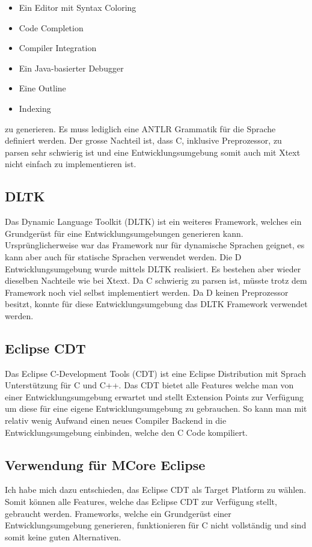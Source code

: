 \begin{itemize} 
	\item Ein Editor mit Syntax Coloring
	\item Code Completion
	\item Compiler Integration
	\item Ein Java-basierter Debugger
	\item Eine Outline
	\item Indexing
\end{itemize}

zu generieren. \cite{xtext} Es muss lediglich eine ANTLR\cite{antlr} Grammatik für die Sprache definiert werden. Der grosse Nachteil ist, dass C, inklusive Preprozessor, zu parsen sehr schwierig ist und eine Entwicklungsumgebung somit auch mit Xtext nicht einfach zu implementieren ist.

\subsection{DLTK}
Das Dynamic Language Toolkit (DLTK) ist ein weiteres Framework, welches ein Grundgerüst für eine Entwicklungsumgebungen generieren kann. Ursprünglicherweise war das Framework nur für dynamische Sprachen geignet, es kann aber auch für statische Sprachen verwendet werden. Die D Entwicklungsumgebung wurde mittels DLTK realisiert\cite{ddt}. Es bestehen aber wieder dieselben Nachteile wie bei Xtext. Da C schwierig zu parsen ist, müsste trotz dem Framework noch viel selbst implementiert werden. Da D keinen Preprozessor besitzt, konnte für diese Entwicklungsumgebung das DLTK Framework verwendet werden.

\subsection{Eclipse CDT}
Das Eclipse C-Development Tools (CDT) ist eine Eclipse Distribution mit Sprach Unterstützung für C und C++. Das CDT bietet alle Features welche man von einer Entwicklungsumgebung erwartet und stellt Extension Points zur Verfügung um diese für eine eigene Entwicklungsumgebung zu gebrauchen. So kann man mit relativ wenig Aufwand einen neues Compiler Backend in die Entwicklungsumgebung einbinden, welche den C Code kompiliert.

\subsection{Verwendung für MCore Eclipse}
Ich habe mich dazu entschieden, das Eclipse CDT als Target Platform zu wählen. Somit können alle Features, welche das Eclipse CDT zur Verfügung stellt, gebraucht werden. Frameworks, welche ein Grundgerüst einer Entwicklungsumgebung generieren, funktionieren für C nicht vollständig und sind somit keine guten Alternativen.
